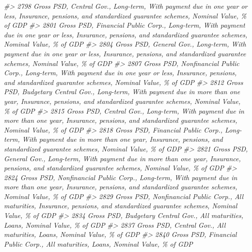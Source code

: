 \documentclass[
]{bxjsbook}
\newenvironment{Shaded}{\begin{snugshade}}{\end{snugshade}}
\newcommand{\CommentTok}[1]{\textcolor[rgb]{0.56,0.35,0.01}{\textit{#1}}}
\theoremstyle{definition}
\theoremstyle{definition}
\theoremstyle{definition}
\theoremstyle{definition}
\theoremstyle{remark}
\begin{document}
\begin{Shaded}
\begin{Highlighting}[]
\CommentTok{\#\textgreater{} 2798                 Gross PSD, Central Gov., Long{-}term, With payment due in one year or less, Insurance, pensions, and standardized guarantee schemes, Nominal Value, \% of GDP}
\CommentTok{\#\textgreater{} 2801       Gross PSD, Financial Public Corp., Long{-}term, With payment due in one year or less, Insurance, pensions, and standardized guarantee schemes, Nominal Value, \% of GDP}
\CommentTok{\#\textgreater{} 2804                 Gross PSD, General Gov., Long{-}term, With payment due in one year or less, Insurance, pensions, and standardized guarantee schemes, Nominal Value, \% of GDP}
\CommentTok{\#\textgreater{} 2807    Gross PSD, Nonfinancial Public Corp., Long{-}term, With payment due in one year or less, Insurance, pensions, and standardized guarantee schemes, Nominal Value, \% of GDP}
\CommentTok{\#\textgreater{} 2812     Gross PSD, Budgetary Central Gov., Long{-}term, With payment due in more than one year, Insurance, pensions, and standardized guarantee schemes, Nominal Value, \% of GDP}
\CommentTok{\#\textgreater{} 2815               Gross PSD, Central Gov., Long{-}term, With payment due in more than one year, Insurance, pensions, and standardized guarantee schemes, Nominal Value, \% of GDP}
\CommentTok{\#\textgreater{} 2818     Gross PSD, Financial Public Corp., Long{-}term, With payment due in more than one year, Insurance, pensions, and standardized guarantee schemes, Nominal Value, \% of GDP}
\CommentTok{\#\textgreater{} 2821               Gross PSD, General Gov., Long{-}term, With payment due in more than one year, Insurance, pensions, and standardized guarantee schemes, Nominal Value, \% of GDP}
\CommentTok{\#\textgreater{} 2824  Gross PSD, Nonfinancial Public Corp., Long{-}term, With payment due in more than one year, Insurance, pensions, and standardized guarantee schemes, Nominal Value, \% of GDP}
\CommentTok{\#\textgreater{} 2829                                     Gross PSD, Nonfinancial Public Corp., All maturities, Insurance, pensions, and standardized guarantee schemes, Nominal Value, \% of GDP}
\CommentTok{\#\textgreater{} 2834                                                                                          Gross PSD, Budgetary Central Gov., All maturities, Loans, Nominal Value, \% of GDP}
\CommentTok{\#\textgreater{} 2837                                                                                                    Gross PSD, Central Gov., All maturities, Loans, Nominal Value, \% of GDP}
\CommentTok{\#\textgreater{} 2840                                                                                          Gross PSD, Financial Public Corp., All maturities, Loans, Nominal Value, \% of GDP}

\end{Highlighting}
\end{Shaded}
\end{document}
